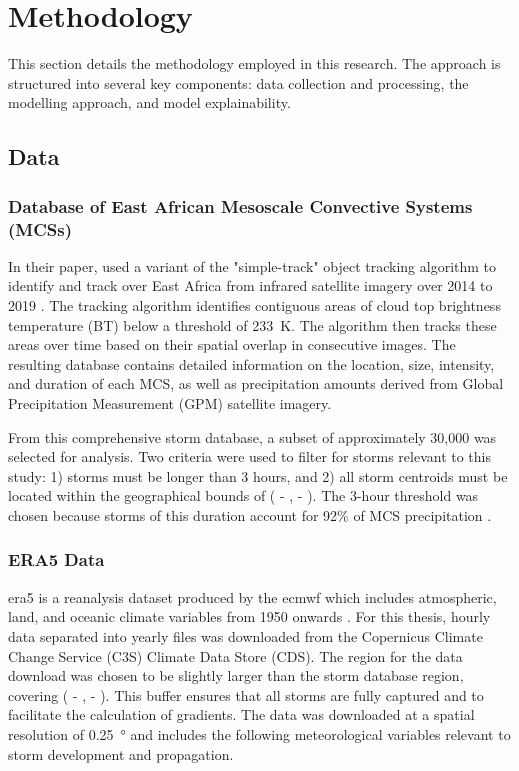 \chapter{Methodology}
\label{ch:method}

This section details the methodology employed in this research. The approach is structured into several key components: data collection and processing, the modelling approach, and model explainability.

\section{Data}

\subsection{Database of East African Mesoscale Convective Systems (MCSs)}

In their paper, \cite{Hill2023} used a variant of the "simple-track" object tracking algorithm to identify and track  over East Africa from infrared satellite imagery over 2014 to 2019 \citep{Stein2020}. The tracking algorithm identifies contiguous areas of cloud top brightness temperature (BT) below a threshold of \SI{233}{\kelvin}. The algorithm then tracks these areas over time based on their spatial overlap in consecutive images. The resulting database contains detailed information on the location, size, intensity, and duration of each MCS, as well as precipitation amounts derived from Global Precipitation Measurement (GPM) satellite imagery.

From this comprehensive storm database, a subset of approximately 30,000 was selected for analysis. Two criteria were used to filter for storms relevant to this study: 1) storms must be longer than 3 hours, and 2) all storm centroids must be located within the geographical bounds of ( - ,  - ). The 3-hour threshold was chosen because storms of this duration account for 92\% of MCS precipitation \citep{Hill2023}.

\subsection{ERA5 Data}

\acrfull{era5} is a reanalysis dataset produced by the \acrfull{ecmwf} which includes atmospheric, land, and oceanic climate variables from 1950 onwards \citep{Hersbach2020}. For this thesis, hourly data separated into yearly files was downloaded from the Copernicus Climate Change Service (C3S) Climate Data Store (CDS). The region for the data download was chosen to be slightly larger than the storm database region, covering ( - ,  - ). This buffer ensures that all storms are fully captured and to facilitate the calculation of gradients. The data was downloaded at a spatial resolution of \SI{0.25}{\degree} and includes the following meteorological variables relevant to storm development and propagation.

